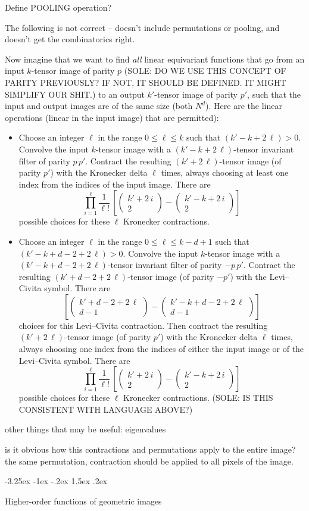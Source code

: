 \documentclass{article}
\makeatletter
\theoremstyle{plain}
\renewcommand{\choose}[2]{\begin{pmatrix}{#1}\\{#2}\end{pmatrix}}
\renewcommand\section{\@startsection {section}{1}{\z@}%
  {-3.25ex \@plus -1ex \@minus -.2ex}%
  {1.5ex \@plus .2ex}%
  {\raggedright\normalfont\large\bfseries}}
\makeatother
\begin{document}
Define POOLING operation?

The following is not correct -- doesn't include permutations or pooling, and doesn't get the combinatorics right.

Now imagine that we want to find \emph{all} linear equivariant functions that go from an input $k$-tensor image of parity $p$ (SOLE: DO WE USE THIS CONCEPT OF PARITY PREVIOUSLY? IF NOT, IT SHOULD BE DEFINED. IT MIGHT SIMPLIFY OUR SHIT.) to an output $k'$-tensor image of parity $p'$, such that the input and output images are of the same size (both $N^d$).
Here are the linear operations (linear in the input image) that are permitted):
\begin{itemize}
\item Choose an integer $\ell$ in the range $0\leq\ell\leq k$ such that $(k'-k+2\,\ell)>0$.
  Convolve the input $k$-tensor image with a $(k'-k+2\,\ell)$-tensor invariant filter of parity $p\,p'$.
  Contract the resulting $(k'+2\,\ell)$-tensor image (of parity $p'$) with the Kronecker delta $\ell$ times, always choosing at least one index from the indices of the input image.
  There are $$\prod_{i=1}^{\ell}\frac{1}{\ell!}\,\left[\choose{k'+2\,i}{2}-\choose{k'-k+2\,i}{2}\right]$$ possible choices for these $\ell$ Kronecker contractions.
\item Choose an integer $\ell$ in the range $0\leq\ell\leq k-d+1$ such that $(k'-k+d-2+2\,\ell)>0$.
  Convolve the input $k$-tensor image with a $(k'-k+d-2+2\,\ell)$-tensor invariant filter of parity $-p\,p'$.
  Contract the resulting $(k'+d-2+2\,\ell)$-tensor image (of parity $-p'$) with the Levi--Civita symbol.
  There are $$\left[\choose{k'+d-2+2\,\ell}{d-1}-\choose{k'-k+d-2+2\,\ell}{d-1}\right]$$ choices for this Levi--Civita contraction.
  Then contract the resulting $(k'+2\,\ell)$-tensor image (of parity $p'$) with the Kronecker delta $\ell$ times, always choosing one index from the indices of either the input image or of the Levi--Civita symbol.
  There are $$\prod_{i=1}^{\ell}\frac{1}{\ell!}\,\left[\choose{k'+2\,i}{2}-\choose{k'-k+2\,i}{2}\right]$$ possible choices for these $\ell$ Kronecker contractions. (SOLE: IS THIS CONSISTENT WITH LANGUAGE ABOVE?)
\end{itemize}

other things that may be useful: eigenvalues

is it obvious how this contractions and permutations apply to the entire image? the same permutation, contraction should be applied to all pixels of the image. 

\section{Higher-order functions of geometric images}\label{sec:nonlinear}
\end{document}
